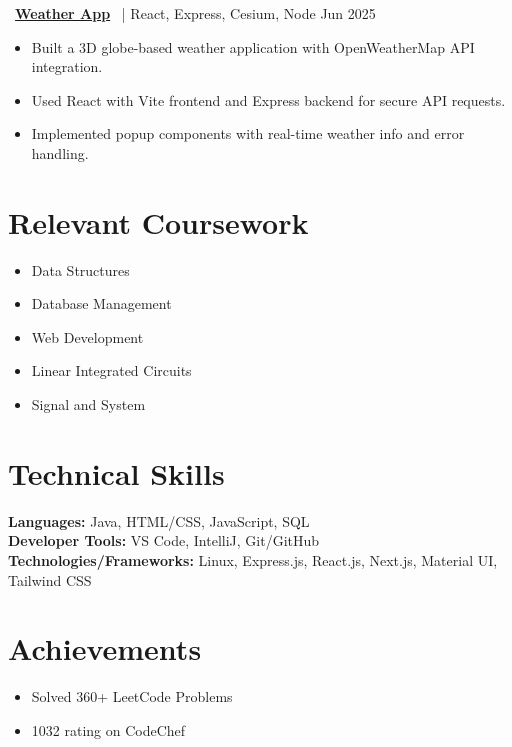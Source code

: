 \documentclass[a4paper,11pt]{article}
\begin{document}
\faGithub \, \href{https://github.com/kgdhake/weather-/tree/master}{\textbf{Weather App}} 
\, | React, Express, Cesium, Node \hfill Jun 2025 
\begin{itemize}[leftmargin=*]   
    \item Built a 3D globe-based weather application with OpenWeatherMap API integration.   
    \item Used React with Vite frontend and Express backend for secure API requests.   
    \item Implemented popup components with real-time weather info and error handling. 
\end{itemize} 


\section{Relevant Coursework} 
\begin{itemize}[leftmargin=*]   
    \item Data Structures   
    \item Database Management   
    \item Web Development   
    \item Linear Integrated Circuits   
    \item Signal and System 
\end{itemize} 

\section{Technical Skills} 
\textbf{Languages:} Java, HTML/CSS, JavaScript, SQL \\ 
\textbf{Developer Tools:} VS Code, IntelliJ, Git/GitHub \\ 
\textbf{Technologies/Frameworks:} Linux, Express.js, React.js, Next.js, Material UI, Tailwind CSS  

\section{Achievements} 
\begin{itemize}[leftmargin=*]   
    \item Solved 360+ LeetCode Problems   
    \item 1032 rating on CodeChef 
\end{itemize} 

\end{document}
